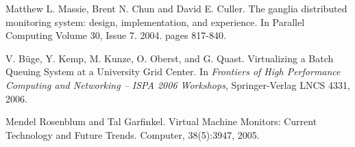 \documentclass[a4paper]{article}
\begin{document}
\begin{thebibliography}{99}
Matthew L. Massie, Brent N. Chun and David E. Culler.
The ganglia distributed monitoring system: design, implementation, and experience.
In Parallel Computing Volume 30, Issue 7. 2004. pages 817-840. 	

V. B\"uge, Y. Kemp, M. Kunze, O. Oberst, and G. Quast.
Virtualizing a Batch Queuing System at a University Grid Center.
In {\em Frontiers of High Performance Computing and Networking -- ISPA 2006
Workshops}, Springer-Verlag LNCS 4331, 2006.

Mendel Rosenblum and Tal Garfinkel. Virtual Machine Monitors: Current Technology
and Future Trends. Computer, 38(5):3947, 2005.

\end{thebibliography}
\end{document}
